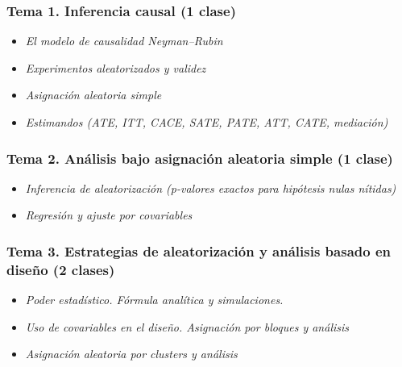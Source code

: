 \documentclass[
  12pt,
]{article}
\providecommand{\tightlist}{%
  \setlength{\itemsep}{0pt}\setlength{\parskip}{0pt}}
\begin{document}
\hypertarget{tema-1.-inferencia-causal-1-clase-1}{%
\subsubsection{Tema 1. Inferencia causal (1
clase)}\label{tema-1.-inferencia-causal-1-clase-1}}

\begin{itemize}
\tightlist
\item
  \emph{El modelo de causalidad Neyman--Rubin}
\item
  \emph{Experimentos aleatorizados y validez}
\item
  \emph{Asignación aleatoria simple}
\item
  \emph{Estimandos (ATE, ITT, CACE, SATE, PATE, ATT, CATE, mediación)}
\end{itemize}

\hypertarget{tema-2.-anuxe1lisis-bajo-asignaciuxf3n-aleatoria-simple-1-clase-1}{%
\subsubsection{Tema 2. Análisis bajo asignación aleatoria simple (1
clase)}\label{tema-2.-anuxe1lisis-bajo-asignaciuxf3n-aleatoria-simple-1-clase-1}}

\begin{itemize}
\tightlist
\item
  \emph{Inferencia de aleatorización (p-valores exactos para hipótesis
  nulas nítidas)}
\item
  \emph{Regresión y ajuste por covariables}
\end{itemize}

\hypertarget{tema-3.-estrategias-de-aleatorizaciuxf3n-y-anuxe1lisis-basado-en-diseuxf1o-2-clases-1}{%
\subsubsection{Tema 3. Estrategias de aleatorización y análisis basado
en diseño (2
clases)}\label{tema-3.-estrategias-de-aleatorizaciuxf3n-y-anuxe1lisis-basado-en-diseuxf1o-2-clases-1}}

\begin{itemize}
\tightlist
\item
  \emph{Poder estadístico. Fórmula analítica y simulaciones.}
\item
  \emph{Uso de covariables en el diseño. Asignación por bloques y
  análisis}
\item
  \emph{Asignación aleatoria por clusters y análisis}
\end{itemize}
\end{document}

